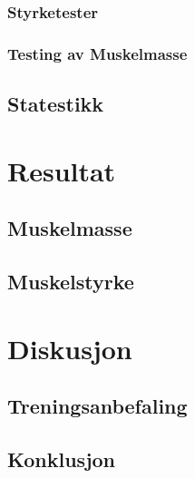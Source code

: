 \documentclass[
]{book}
\begin{document}
\hypertarget{styrketester}{%
\subsubsection{Styrketester}\label{styrketester}}

\hypertarget{testing-av-muskelmasse}{%
\subsubsection{Testing av Muskelmasse}\label{testing-av-muskelmasse}}

\hypertarget{statestikk}{%
\subsection{Statestikk}\label{statestikk}}

\hypertarget{resultat-1}{%
\section{Resultat}\label{resultat-1}}

\hypertarget{muskelmasse}{%
\subsection{Muskelmasse}\label{muskelmasse}}

\hypertarget{muskelstyrke}{%
\subsection{Muskelstyrke}\label{muskelstyrke}}

\hypertarget{diskusjon-2}{%
\section{Diskusjon}\label{diskusjon-2}}

\hypertarget{treningsanbefaling}{%
\subsection{Treningsanbefaling}\label{treningsanbefaling}}

\hypertarget{konklusjon}{%
\subsection{Konklusjon}\label{konklusjon}}

  
\end{document}
